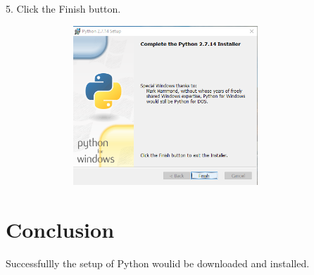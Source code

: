 \documentclass[11pt]{article}            %
\begin{document}
5. Click the Finish button.\\ 
\begin{center}

  \includegraphics[width=12cm,height=6cm,keepaspectratio]{4.png}\\
\end{center}






\section{Conclusion}  
Successfullly the setup of Python woulid be downloaded and installed.
 
\end{document}
